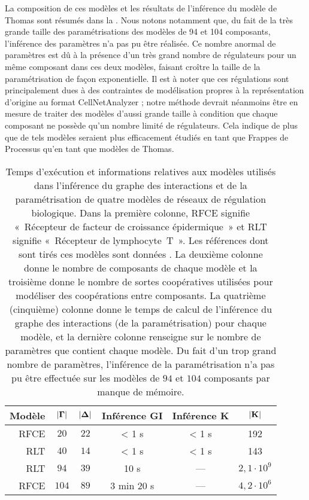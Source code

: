 La composition de ces modèles et les résultats de l'inférence du modèle de Thomas
sont résumés dans la .
Nous notons notamment que, du fait de la très grande taille des paramétrisations
des modèles de 94 et 104 composants, l'inférence des paramètres n'a pas pu être réalisée.
Ce nombre anormal de paramètres est dû à la présence d'un très grand nombre de régulateurs
pour un même composant dans ces deux modèles, faisant croître la taille de la paramétrisation
de façon exponentielle.
Il est à noter que ces régulations sont principalement dues à des contraintes de modélisation
propres à la représentation d'origine au format CellNetAnalyzer ;
notre méthode devrait néanmoins être en mesure de traiter des modèles d'aussi grande taille
à condition que chaque composant ne possède qu'un nombre limité de régulateurs.
Cela indique de plus que de tels modèles seraient plus efficacement étudiés
en tant que Frappes de Processus qu'en tant que modèles de Thomas.

\begin{table}[ht]
  \ZifferAn
  \begin{center}
  \begin{tabular}{r|c|c|c|c|c}
    \textbf{Modèle} & $\mathbf{|\Gamma|}$ & $\mathbf{|\Delta|}$ &
      \textbf{Inférence GI} & \textbf{Inférence K} & $\mathbf{|K|}$
  \\\hline\hline
    RFCE & %
      $20$ & $22$ & < 1 s & < 1 s & 192
  \\\hline
    RLT & %
      $40$ & $14$ & < 1 s & < 1 s & 143
  \\\hline
    RLT & %
      $94$ & $39$ & 10 s & --- & $2,1\cdot10^{9}$
  \\\hline
    RFCE & %
      $104$ & $89$ & 3 min 20 s & --- & $4,2\cdot10^{6}$
  \end{tabular}
  \end{center}
  \caption{%
    Temps d'exécution et informations relatives aux modèles
    utilisés dans l'inférence du graphe des interactions et de la paramétrisation
    de quatre modèles de réseaux de régulation biologique.
    Dans la première colonne, RFCE signifie «~Récepteur de facteur de croissance épidermique~»
    et RLT signifie «~Récepteur de lymphocyte~T~».
    Les références dont sont tirés ces modèles sont données .
    La deuxième colonne donne le nombre de composants de chaque modèle
    et la troisième donne le nombre de sortes coopératives utilisées pour modéliser
    des coopérations entre composants.
    La quatrième (\resp cinquième) colonne donne le temps de calcul de l'inférence
    du graphe des interactions (\resp de la paramétrisation) pour chaque modèle,
    et la dernière colonne renseigne sur le nombre de paramètres que contient chaque modèle.
    Du fait d'un trop grand nombre de paramètres, l'inférence de la paramétrisation
    n'a pas pu être effectuée sur les modèles de $94$ et $104$ composants par manque de mémoire.
  }
  \ZifferAus
\end{table}

